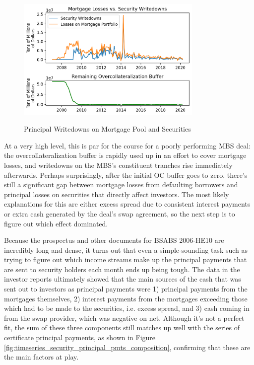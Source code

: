 \documentclass[12pt]{article}
\begin{document}
\begin{figure}[h]
	\centering
	\caption{Principal Writedowns on Mortgage Pool and Securities}
	\includegraphics[width=0.8\textwidth]{../figures/timeseries_losses_vs_writedowns}
	\label{fig:timeseries_losses_vs_writedowns}
\end{figure}

At a very high level, this is par for the course for a poorly performing MBS deal: the overcollateralization buffer is rapidly used up in an effort to cover mortgage losses, and writedowns on the MBS’s constituent tranches rise immediately afterwards. Perhaps surprisingly, after the initial OC buffer goes to zero, there’s still a significant gap between mortgage losses from defaulting borrowers and principal losses on securities that directly affect investors. The most likely explanations for this are either excess spread due to consistent interest payments or extra cash generated by the deal’s swap agreement, so the next step is to figure out which effect dominated.

	Because the prospectus and other documents for BSABS 2006-HE10 are incredibly long and dense, it turns out that even a simple-sounding task such as trying to figure out which income streams make up the principal payments that are sent to security holders each month ends up being tough. The data in the investor reports ultimately showed that the main sources of the cash that was sent out to investors as principal payments were 1) principal payments from the mortgages themselves, 2) interest payments from the mortgages exceeding those which had to be made to the securities, i.e. excess spread, and 3) cash coming in from the swap provider, which was negative on net. Although it’s not a perfect fit, the sum of these three components still matches up well with the series of certificate principal payments, as shown in Figure \ref{fig:timeseries_security_principal_pmts_composition}, confirming that these are the main factors at play.
\end{document}

